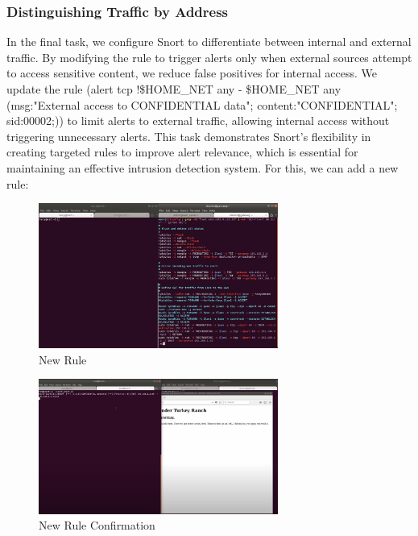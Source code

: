 \documentclass[a4paper,11pt]{article} %
\begin{document}
\subsubsection{Distinguishing Traffic by Address}
In the final task, we configure Snort to differentiate between internal and external traffic. By modifying the rule to trigger alerts only when external sources attempt to access sensitive content, we reduce false positives for internal access. We update the rule (alert tcp !\$HOME\_NET any -\> \$HOME\_NET any (msg:"External access to CONFIDENTIAL data"; content:"CONFIDENTIAL"; sid:00002;)) to limit alerts to external traffic, allowing internal access without triggering unnecessary alerts. This task demonstrates Snort’s flexibility in creating targeted rules to improve alert relevance, which is essential for maintaining an effective intrusion detection system.
For this, we can add a new rule:

\begin{figure}[h!]
    \centering
    \includegraphics[width=0.7\textwidth]{images/24.png}
    \caption{New Rule}
\end{figure}

\break

\begin{figure}[h!]
    \centering
    \includegraphics[width=0.7\textwidth]{images/25.png}
    \caption{New Rule Confirmation}
\end{figure}
\end{document}
